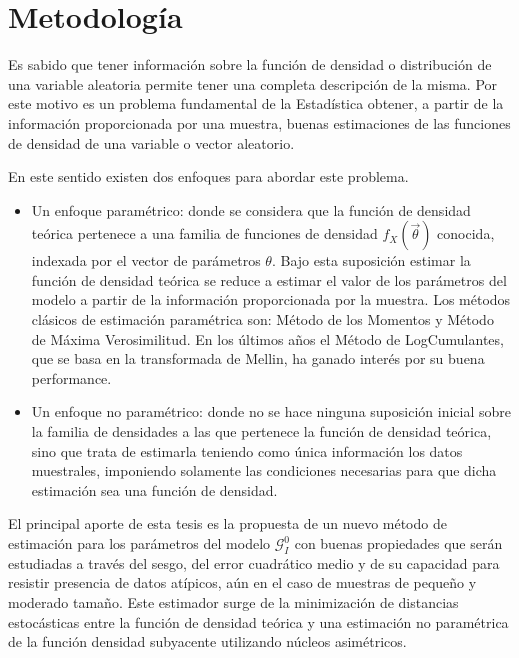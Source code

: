 
\chapter{Metodología}

Es sabido que tener información sobre la función de densidad o distribución de una variable aleatoria permite tener una completa descripción de la misma. Por este motivo es un problema fundamental de la Estadística obtener, a partir de la información proporcionada por una muestra,  buenas estimaciones de las funciones de densidad de una variable o vector aleatorio. 

En este sentido existen dos enfoques para abordar este problema. 

\begin{itemize}
	\item Un enfoque paramétrico: donde se considera que la función de densidad teórica pertenece a una familia de funciones de densidad $f_X(\vec{\theta})$ conocida, indexada por el vector de parámetros $\theta$. Bajo esta suposición estimar la función de densidad teórica se reduce a estimar el valor de los parámetros del modelo a partir de la información proporcionada por la muestra. Los métodos clásicos de estimación paramétrica son: Método de los Momentos y Método de Máxima Verosimilitud. En los últimos años el Método de LogCumulantes, que se basa en la transformada de Mellin, ha ganado interés por su buena performance.
	\item Un enfoque no paramétrico: donde no se hace ninguna suposición inicial sobre la familia de densidades a las que pertenece la función de densidad teórica, sino que trata de estimarla teniendo como única información los datos muestrales, imponiendo  solamente las condiciones necesarias para que dicha estimación sea una función de densidad.
\end{itemize}

El principal aporte de esta tesis es la propuesta de un nuevo método de estimación para los parámetros del modelo $\mathcal G_I^0$ con buenas propiedades que serán estudiadas a través del sesgo, del error cuadrático medio y de su capacidad para resistir presencia de datos atípicos, aún en el caso de muestras de pequeño y moderado tamaño. Este estimador surge de la minimización de distancias estocásticas entre la función de densidad teórica y una estimación no paramétrica de la función densidad subyacente utilizando núcleos asimétricos. 


